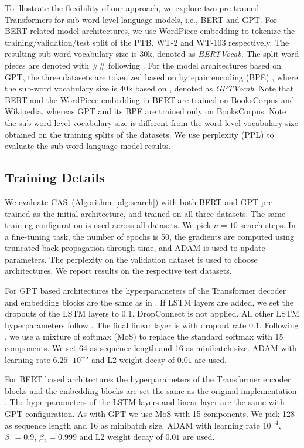 \documentclass[11pt,a4paper]{article}
\begin{document}
To illustrate the flexibility of our approach, we explore two
pre-trained Transformers for sub-word level language models, i.e., BERT and GPT.  For
BERT related model architectures, we use WordPiece
embedding \cite{wu2016google} to tokenize the
training/validation/test split of the PTB, WT-2 and WT-103
respectively. The resulting sub-word vocabulary size is 30k, denoted as
{\it BERTVocab}. The split word pieces are denoted with $\#\#$
following \cite{devlin2018bert}.  For the model architectures based on
GPT, the three datasets are tokenized based on bytepair encoding
(BPE) \cite{SennrichHB16a}, where the sub-word vocabulary size is 40k
based on \cite{radford2018improving}, denoted as {\it GPTVocab}.  Note
that BERT and the WordPiece embedding in BERT are trained on
BooksCorpus and Wikipedia, whereas GPT and its BPE are trained only on
BooksCorpus. 
Note the sub-word level vocabulary size is different from the word-level vocabulary size obtained on the training splits of the datasets. 
We use perplexity (PPL) to evaluate the sub-word language model results.

\subsection{Training Details}

We evaluate CAS~(Algorithm~\ref{alg:search}) with both BERT and GPT pre-trained as the initial architecture, and trained on all three datasets. 
The same training configuration is used across all datasets.
We pick $n=10$ search steps. In a fine-tuning task, the number of epochs is 50, the gradients are computed using truncated back-propagation through time, and ADAM \cite{kingma2014adam} is used to update parameters. The perplexity on the validation dataset is used to choose architectures. We report results on the respective test datasets.

For GPT based architectures the hyperparameters of the Transformer decoder and embedding blocks are the same as in \cite{radford2018improving}. If LSTM layers are added, we set the dropouts of the LSTM layers to 0.1. DropConnect is not applied. All other LSTM hyperparameters follow \cite{Merity02182}. The final linear layer is with dropout rate 0.1. Following \cite{Yang03953}, we use a mixture of softmax (MoS) to replace the standard softmax with 15 components. We set 64 as sequence length and 16 as minibatch size. ADAM with learning rate $6.25 \cdot 10^{-5}$ and L2 weight decay of $0.01$ are used.

For BERT based architectures the hyperparameters of the Transformer encoder blocks and the embedding blocks are set the same as the original implementation \cite{devlin2018bert}. The hyperparameters of the LSTM layers and linear layer are the same with GPT configuration. As with GPT we use MoS with 15 components. We pick 128 as sequence length and 16 as minibatch size. ADAM with learning rate $10^{-4}$, $\beta_1 = 0.9$, $\beta_2 = 0.999$ and L2 weight decay of $0.01$ are used.
\end{document}
